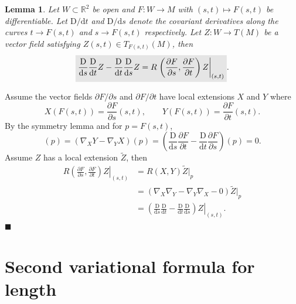 \documentclass[letter-paper]{tufte-book}
\newtheorem{lemma}[theorem]{\color{pastel-blue}Lemma}
\newenvironment{proof}[1][Proof]{\begin{trivlist}
\item[\hskip \labelsep {\bfseries #1}]}{\end{trivlist}}
\newcommand{\qed}{\hfill$\blacksquare$}
\newcommand{\highlight}[1]{\mathchoice%
  {\colorbox{black!10}{$\displaystyle#1$}}%
  {\colorbox{black!10}{$\textstyle#1$}}%
  {\colorbox{black!10}{$\scriptstyle#1$}}%
  {\colorbox{black!10}{$\scriptscriptstyle#1$}}}%
\begin{document}
\begin{lemma}
  Let $W\subset \mathbb{R}^2$ be open and $F : W\to M$ with $(s,t)\mapsto F(s,t)$ be differentiable. Let $\mathrm{D}/\mathrm{d}t$ and $\mathrm{D}/\mathrm{d}s$ denote the covariant derivatives along the curves $t\to F(s,t)$ and $s\to F(s,t)$ respectively. Let $Z:W \to T(M)$ be a vector field satisfying $Z(s,t) \in T_{F(s,t)}(M)$, then
  \begin{equation}
    \highlight{\frac{\mathrm{D}}{\mathrm{d}s} \frac{\mathrm{D}}{\mathrm{d}t} Z - \frac{\mathrm{D}}{\mathrm{d}t} \frac{\mathrm{D}}{\mathrm{d}s} Z = R\left.\left(\frac{\partial F}{\partial s}, \frac{\partial F}{\partial t} \right)Z\right|_{(s,t)}}.
  \end{equation}
\end{lemma}

\begin{proof}
  Assume the vector fields $\partial F / \partial s$ and $\partial F / \partial t$ have local extensions $X$ and $Y$ where
  \begin{equation*}
    X(F(s,t)) = \frac{\partial F}{\partial s}(s,t), \qquad Y(F(s,t)) = \frac{\partial F}{\partial t}(s,t).
  \end{equation*}
  By the symmetry lemma and for $p = F(s,t)$,
  \begin{equation*}
    [X,Y](p) = (\nabla_X Y -\nabla_Y X)(p) = \left(\frac{\mathrm{D}}{\mathrm{d}s} \frac{\partial F}{\partial t} - \frac{\mathrm{D}}{\mathrm{d}t} \frac{\partial F}{\partial s}\right)(p) = 0.
  \end{equation*}
  Assume $Z$ has a local extension $\tilde{Z}$, then
  \begin{align*}
    R\left.\left(\frac{\partial F}{\partial s}, \frac{\partial F}{\partial t} \right)Z\right|_{(s,t)}
      &= R(X,Y) \tilde{Z}|_p\\
      &= (\nabla_X \nabla_Y - \nabla_Y \nabla_X - 0)\tilde{Z}|_p\\
      &= \left.\left(\frac{\mathrm{D}}{\mathrm{d}s} \frac{\mathrm{D}}{\mathrm{d}t}  - \frac{\mathrm{D}}{\mathrm{d}t} \frac{\mathrm{D}}{\mathrm{d}s}\right) Z\right|_{(s,t)}.
  \end{align*}
  \qed
\end{proof}


\section{Second variational formula for length}
\end{document}

